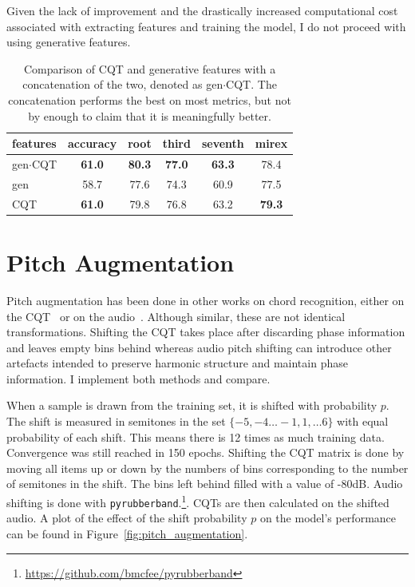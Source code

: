 Given the lack of improvement and the drastically increased computational cost associated with extracting features and training the model, I do not proceed with using generative features.

\begin{table}
    \centering
    \begin{tabular}{lccccc}
        \toprule
        features & accuracy & root  & third & seventh & mirex \\  
        \midrule
        gen$\cdot$CQT  & \textbf{61.0}     & \textbf{80.3}  & \textbf{77.0}  & \textbf{63.3}    & 78.4  \\
        gen      & 58.7     & 77.6  & 74.3  & 60.9    & 77.5  \\
        CQT      & \textbf{61.0}     & 79.8  & 76.8  & 63.2    & \textbf{79.3}  \\
        \bottomrule
    \end{tabular}
    \caption{Comparison of CQT and generative features with a concatenation of the two, denoted as gen$\cdot$CQT. The concatenation performs the best on most metrics, but not by enough to claim that it is meaningfully better. }\label{tab:gen_feature_comparison}
\end{table}

\section{Pitch Augmentation}\label{sec:pitch-augmentation}

Pitch augmentation has been done in other works on chord recognition, either on the CQT~\citep{ACRLargeVocab1} or on the audio~\citep{BTC,StructuredTraining}. Although similar, these are not identical transformations. Shifting the CQT takes place after discarding phase information and leaves empty bins behind whereas audio pitch shifting can introduce other artefacts intended to preserve harmonic structure and maintain phase information. I implement both methods and compare.

When a sample is drawn from the training set, it is shifted with probability $p$. The shift is measured in semitones in the set $\{-5,-4\ldots -1, 1, \ldots 6\}$ with equal probability of each shift. This means there is 12 times as much training data. Convergence was still reached in 150 epochs. Shifting the CQT matrix is done by moving all items up or down by the numbers of bins corresponding to the number of semitones in the shift. The bins left behind filled with a value of -80dB. Audio shifting is done with \texttt{pyrubberband}.\footnote{\url{https://github.com/bmcfee/pyrubberband}}. CQTs are then calculated on the shifted audio. A plot of the effect of the shift probability $p$ on the model's performance can be found in Figure~\ref{fig:pitch_augmentation}.

